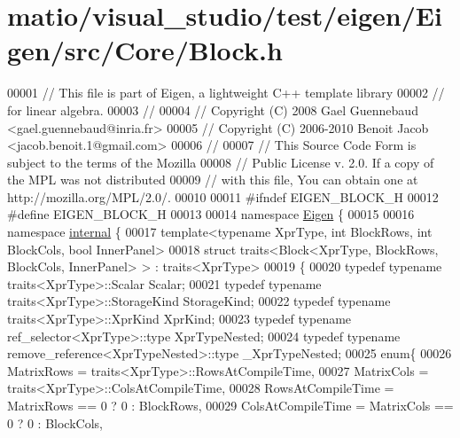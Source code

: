 \hypertarget{matio_2visual__studio_2test_2eigen_2_eigen_2src_2_core_2_block_8h_source}{}\section{matio/visual\+\_\+studio/test/eigen/\+Eigen/src/\+Core/\+Block.h}
\label{matio_2visual__studio_2test_2eigen_2_eigen_2src_2_core_2_block_8h_source}

\begin{DoxyCode}
00001 \textcolor{comment}{// This file is part of Eigen, a lightweight C++ template library}
00002 \textcolor{comment}{// for linear algebra.}
00003 \textcolor{comment}{//}
00004 \textcolor{comment}{// Copyright (C) 2008 Gael Guennebaud <gael.guennebaud@inria.fr>}
00005 \textcolor{comment}{// Copyright (C) 2006-2010 Benoit Jacob <jacob.benoit.1@gmail.com>}
00006 \textcolor{comment}{//}
00007 \textcolor{comment}{// This Source Code Form is subject to the terms of the Mozilla}
00008 \textcolor{comment}{// Public License v. 2.0. If a copy of the MPL was not distributed}
00009 \textcolor{comment}{// with this file, You can obtain one at http://mozilla.org/MPL/2.0/.}
00010 
00011 \textcolor{preprocessor}{#ifndef EIGEN\_BLOCK\_H}
00012 \textcolor{preprocessor}{#define EIGEN\_BLOCK\_H}
00013 
00014 \textcolor{keyword}{namespace }\hyperlink{namespace_eigen}{Eigen} \{ 
00015 
00016 \textcolor{keyword}{namespace }\hyperlink{namespaceinternal}{internal} \{
00017 \textcolor{keyword}{template}<\textcolor{keyword}{typename} XprType, \textcolor{keywordtype}{int} BlockRows, \textcolor{keywordtype}{int} BlockCols, \textcolor{keywordtype}{bool} InnerPanel>
00018 \textcolor{keyword}{struct }traits<Block<XprType, BlockRows, BlockCols, InnerPanel> > : traits<XprType>
00019 \{
00020   \textcolor{keyword}{typedef} \textcolor{keyword}{typename} traits<XprType>::Scalar Scalar;
00021   \textcolor{keyword}{typedef} \textcolor{keyword}{typename} traits<XprType>::StorageKind StorageKind;
00022   \textcolor{keyword}{typedef} \textcolor{keyword}{typename} traits<XprType>::XprKind XprKind;
00023   \textcolor{keyword}{typedef} \textcolor{keyword}{typename} ref\_selector<XprType>::type XprTypeNested;
00024   \textcolor{keyword}{typedef} \textcolor{keyword}{typename} remove\_reference<XprTypeNested>::type \_XprTypeNested;
00025   \textcolor{keyword}{enum}\{
00026     MatrixRows = traits<XprType>::RowsAtCompileTime,
00027     MatrixCols = traits<XprType>::ColsAtCompileTime,
00028     RowsAtCompileTime = MatrixRows == 0 ? 0 : BlockRows,
00029     ColsAtCompileTime = MatrixCols == 0 ? 0 : BlockCols,

\end{DoxyCode}
